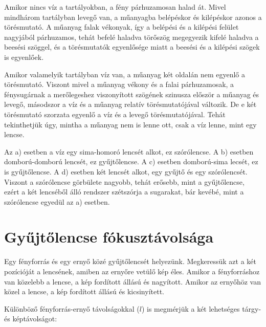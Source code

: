 \documentclass[12pt]{article}
\begin{document}
Amikor nincs víz a tartályokban, a fény párhuzamosan halad át. Mivel mindhárom tartályban levegő van, a műanyagba belépéskor és kilépéskor azonos a törésmutató. A műanyag falak vékonyak, így a belépési és a kilépési felület nagyjából párhuzamos, tehát befelé haladva törőszög megegyezik kifelé haladva a beesési szöggel, és a törésmutatók egyenlősége miatt a beesési és a kilépési szögek is egyenlőek. 

Amikor valamelyik tartályban víz van, a műanyag két oldalán nem egyenlő a törésmutató. Viszont mivel a műanyag vékony és a falai párhuzamosak, a fénysugárnak a merőlegeshez viszonyított szögének szinusza először a műanyag és levegő, másodszor a víz és a műanyag relatív törésmutatójával változik. De e két törésmutató szorzata egyenlő a víz és a levegő törésmutatójával. Tehát tekinthetjük úgy, mintha a műanyag nem is lenne ott, csak a víz lenne, mint egy lencse.

Az a) esetben a víz egy sima-homoró lencsét alkot, ez szórólencse. A b) esetben domború-domború lencsét, ez gyűjtőlencse. A c) esetben domború-sima lecsét, ez is gyűjtőlencse. A d) esetben két lencsét alkot, egy gyűjtő és egy szórólencsét. Viszont a szórólencse görbülete nagyobb, tehát erősebb, mint a gyűjtőlencse, ezért a két lencséből álló rendszer szétszórja a sugarakat, bár kevébé, mint a szórólencse egyedül az a) esetben.


\section{Gyűjtőlencse fókusztávolsága}

Egy fényforrás és egy ernyő közé gyűjtőlencsét helyezünk. Megkeressük azt a két pozícióját a lencsének, amiben az ernyőre vetülő kép éles. Amikor a fényforráshoz van közelebb a lencse, a kép fordított állású és nagyított. Amikor az ernyőhöz van közel a lencse, a kép fordított állású és kicsinyített.

Különböző fényforrás-ernyő távolságokkal ($l$) is megmérjük a két lehetséges tárgy-és képtávolságot:
\end{document}
